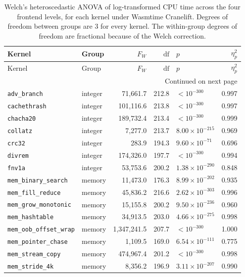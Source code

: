 {\scriptsize\setlength{\tabcolsep}{4pt}%
\begin{longtable}{llrrp{2.0cm}r}
\caption{Welch's heteroscedastic ANOVA of log-transformed CPU time across the four frontend levels, for each kernel under Wasmtime Cranelift. Degrees of freedom between groups are 3 for every kernel. The within-group degrees of freedom are fractional because of the Welch correction.}\label{tab:per_kernel_anova}\\
\toprule
Kernel & Group & $F_W$ & $\mathrm{df}$ & $p$ & $\eta_p^2$ \\
\midrule
\endfirsthead
\toprule
Kernel & Group & $F_W$ & $\mathrm{df}$ & $p$ & $\eta_p^2$ \\
\midrule
\endhead
\midrule
\multicolumn{6}{r}{Continued on next page}\\
\endfoot
\bottomrule
\endlastfoot
\texttt{adv\_branch} & integer & 71,661.7 & 212.8 & $<10^{-300}$ & 0.997 \\
\texttt{cachethrash} & integer & 101,116.6 & 213.8 & $<10^{-300}$ & 0.997 \\
\texttt{chacha20} & integer & 189,732.4 & 213.4 & $<10^{-300}$ & 0.999 \\
\texttt{collatz} & integer & 7,277.0 & 213.7 & $8.00\times10^{-215}$ & 0.969 \\
\texttt{crc32} & integer & 283.9 & 194.3 & $9.60\times10^{-71}$ & 0.696 \\
\texttt{divrem} & integer & 174,326.0 & 197.7 & $<10^{-300}$ & 0.994 \\
\texttt{fnv1a} & integer & 53,753.6 & 200.2 & $1.38\times10^{-290}$ & 0.848 \\
\texttt{mem\_binary\_search} & memory & 11,473.0 & 176.3 & $8.99\times10^{-202}$ & 0.935 \\
\texttt{mem\_fill\_reduce} & memory & 45,836.2 & 216.6 & $2.62\times10^{-303}$ & 0.996 \\
\texttt{mem\_grow\_monotonic} & memory & 15,155.8 & 200.2 & $9.50\times10^{-236}$ & 0.960 \\
\texttt{mem\_hashtable} & memory & 34,913.5 & 203.0 & $4.66\times10^{-275}$ & 0.998 \\
\texttt{mem\_oob\_offset\_wrap} & memory & 1,347,241.5 & 207.7 & $<10^{-300}$ & 1.000 \\
\texttt{mem\_pointer\_chase} & memory & 1,109.5 & 169.0 & $6.54\times10^{-111}$ & 0.775 \\
\texttt{mem\_stream\_copy} & memory & 474,967.4 & 201.2 & $<10^{-300}$ & 0.998 \\
\texttt{mem\_stride\_4k} & memory & 8,356.2 & 196.9 & $3.11\times10^{-207}$ & 0.990 \\

\end{longtable}}
